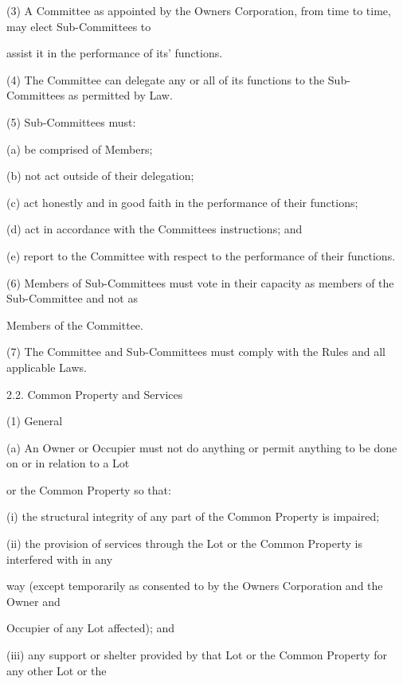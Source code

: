 \documentclass{article}
\begin{document}
{\fontsize{9.962}{1}(3) A Committee as appointed by the Owners Corporation, from time to time, may elect Sub-Committees to }

{\fontsize{10.02}{1}assist it in the performance of its’ functions. }

{\fontsize{9.962}{1}(4) The Committee can delegate any or all of its functions to the Sub-Committees as permitted by Law. }

{\fontsize{9.962}{1}(5) Sub-Committees must: }

{\fontsize{9.962}{1}(a) be comprised of Members; }

{\fontsize{9.962}{1}(b) not act outside of their delegation; }

{\fontsize{9.962}{1}(c) act honestly and in good faith in the performance of their functions; }

{\fontsize{9.962}{1}(d) act in accordance with the Committees instructions; and }

{\fontsize{9.962}{1}(e) report to the Committee with respect to the performance of their functions. }

{\fontsize{9.962}{1}(6) Members of Sub-Committees must vote in their capacity as members of the Sub-Committee and not as }

{\fontsize{10.02}{1}Members of the Committee. }

{\fontsize{9.962}{1}(7) The Committee and Sub-Committees must comply with the Rules and all applicable Laws. }

{\fontsize{9.99}{1}2.2. Common Property and Services }

{\fontsize{9.962}{1}(1) General }

{\fontsize{9.962}{1}(a) An Owner or Occupier must not do anything or permit anything to be done on or in relation to a Lot }

{\fontsize{10.02}{1}or the Common Property so that: }

{\fontsize{9.962}{1}(i) the structural integrity of any part of the Common Property is impaired; }

{\fontsize{9.962}{1}(ii) the provision of services through the Lot or the Common Property is interfered with in any }

{\fontsize{10.02}{1}way (except temporarily as consented to by the Owners Corporation and the Owner and }

{\fontsize{10.02}{1}Occupier of any Lot affected); and }

{\fontsize{9.962}{1}(iii) any support or shelter provided by that Lot or the Common Property for any other Lot or the }
\end{document}
